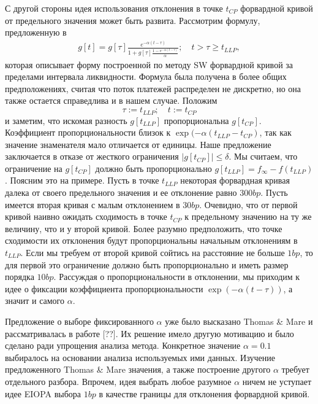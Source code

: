 \documentclass[10pt]{article}
\theoremstyle{definition}
\theoremstyle{remark}
\theoremstyle{plain}
\newcommand{\w}{f_\infty}
\begin{document}
С другой стороны идея использования отклонения в точке $t_{CP}$ форвардной кривой от предельного значения может быть развита.  Рассмотрим формулу, предложенную в \cite{Lager}
\begin{align}
g[t] = g[\tau]\frac{e^{-\alpha(t-\tau)}}{1+g[\tau]\frac{1 - e^{-\alpha(t-\tau)}}{\alpha}}; \quad t>\tau\geqslant t_{LLP}, \label{forward_lager}
\end{align} 
которая описывает форму построенной по методу SW форвардной кривой за пределами интервала ликвидности. Формула была получена в более общих предположениях, считая что поток платежей распределен не дискретно, но она также остается справедлива и в нашем случае. Положим $$\tau := t_{LLP}; \quad t := t_{CP}$$ и заметим, что искомая разность $g[t_{LLP}]$ пропорциональна $g[t_{CP}]$. Коэффициент пропорциональности близок к $\exp(-\alpha(t_{LLP} - t_{CP})$, так как значение знаменателя мало отличается от единицы. 
 Наше предложение заключается в отказе от жесткого ограничения  $|g[t_{CP}]|\leqslant\delta$. Мы считаем, что ограничение на  $g[t_{CP}] $ должно быть пропорционально $g[t_{LLP}] = \w-f(t_{LLP})$. Поясним это на примере. Пусть в точке $t_{LLP}$ некоторая форвардная кривая далека от своего предельного значения и ее отклонение равно $300bp$. Пусть имеется вторая кривая с малым отклонением в $30bp$. Очевидно, что от первой кривой наивно ожидать сходимость в точке $t_{CP}$ к предельному значению на ту же величину, что и у второй кривой. Более разумно предположить, что точке сходимости их отклонения будут пропорциональны начальным отклонениям в $t_{LLP}$. Если мы требуем от второй кривой сойтись на расстояние не больше $1bp$, то для первой это ограничение должно быть пропорционально и иметь размер порядка $10bp$. Рассуждая о пропорциональности в отклонении, мы приходим к идее о фиксации коэффициента пропорциональности $\exp(-\alpha(t - \tau))$, а значит и самого $\alpha$. 
 
 Предложение о выборе фиксированного $\alpha$ уже было высказано Thomas \& Mare и рассматривалась в работе [??]. Их решение имело другую мотивацию и было сделано ради упрощения анализа метода. Конкретное значение $\alpha=0.1$ выбиралось на основании анализа используемых ими данных. Изучение предложенного Thomas \& Mare значения, а также построение другого $\alpha$ требует отдельного разбора. Впрочем, идея выбрать любое разумное $\alpha$ ничем не уступает идее EIOPA выбора $1bp$ в качестве границы для отклонения форвардной кривой. 
\end{document}
